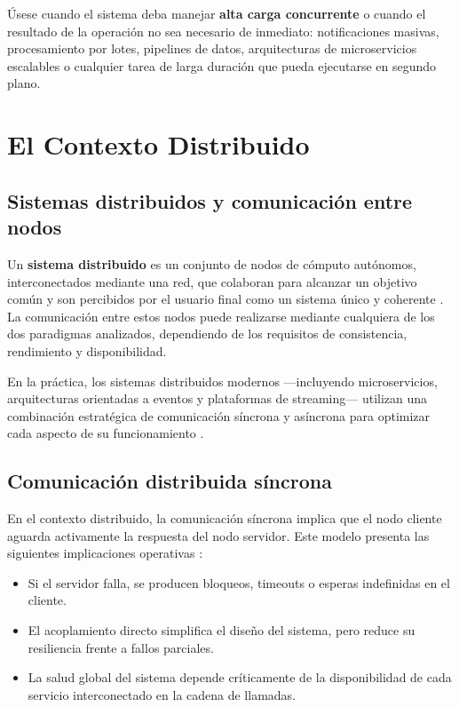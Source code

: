 \documentclass[12pt,a4paper]{article}
\begin{document}
\begin{infobox}
Úsese cuando el sistema deba manejar \textbf{alta carga concurrente} o cuando el resultado de la operación no sea necesario de inmediato: notificaciones masivas, procesamiento por lotes, pipelines de datos, arquitecturas de microservicios escalables o cualquier tarea de larga duración que pueda ejecutarse en segundo plano.
\end{infobox}
 
\section{El Contexto Distribuido}
 
\subsection{Sistemas distribuidos y comunicación entre nodos}
 
Un \textbf{sistema distribuido} es un conjunto de nodos de cómputo autónomos, interconectados mediante una red, que colaboran para alcanzar un objetivo común y son percibidos por el usuario final como un sistema único y coherente \cite{ref15}. La comunicación entre estos nodos puede realizarse mediante cualquiera de los dos paradigmas analizados, dependiendo de los requisitos de consistencia, rendimiento y disponibilidad.
 
En la práctica, los sistemas distribuidos modernos —incluyendo microservicios, arquitecturas orientadas a eventos y plataformas de streaming— utilizan una combinación estratégica de comunicación síncrona y asíncrona para optimizar cada aspecto de su funcionamiento \cite{ref16}.
 
\subsection{Comunicación distribuida síncrona}
 
En el contexto distribuido, la comunicación síncrona implica que el nodo cliente aguarda activamente la respuesta del nodo servidor. Este modelo presenta las siguientes implicaciones operativas \cite{ref7}:
 
\begin{itemize}
  \item Si el servidor falla, se producen bloqueos, timeouts o esperas indefinidas en el cliente.
  \item El acoplamiento directo simplifica el diseño del sistema, pero reduce su resiliencia frente a fallos parciales.
  \item La salud global del sistema depende críticamente de la disponibilidad de cada servicio interconectado en la cadena de llamadas.
\end{itemize}
 
\end{document}
